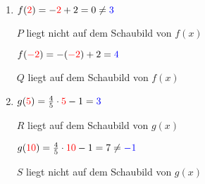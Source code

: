 \newpage
\begin{Answer}[ref=punktprobeA1]
	
	\begin{minipage}{0.5\textwidth}
		\begin{enumerate}[label=\alph*)]
			\item \(f(\textcolor{red}{2})=-\textcolor{red}{2}+2=0\neq\textcolor{blue}{3}\)
			
			\(P\) liegt nicht auf dem Schaubild von \(f(x)\)
			
			\(f(\textcolor{red}{-2})=-\left(\textcolor{red}{-2}\right)+2=\textcolor{blue}{4}\)
			
			\(Q\) liegt auf dem Schaubild von \(f(x)\)
		\end{enumerate}
	\end{minipage}%
	\begin{minipage}{0.5\textwidth}
		\begin{enumerate}[label=\alph*)]
			\setcounter{enumi}{1}
			\item \(g(\textcolor{red}{5})=\tfrac{4}{5}\cdot\textcolor{red}{5}-1=\textcolor{blue}{3}\)
			
			\(R\) liegt auf dem Schaubild von \(g(x)\)
			
			\(g(\textcolor{red}{10})=\tfrac{4}{5}\cdot\textcolor{red}{10}-1=7\neq\textcolor{blue}{-1}\)
			
			\(S\) liegt nicht auf dem Schaubild von \(g(x)\)
		\end{enumerate}
	\end{minipage}%
\end{Answer}
\vspace{1cm}
